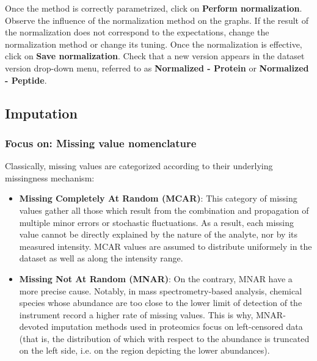 \documentclass[12pt]{article}
\begin{document}
Once the method is correctly parametrized, click on \textbf{Perform normalization}.
Observe the influence of the normalization method on the graphs. %
If the result of the normalization does not correspond to the expectations, change the normalization method or change its tuning.
Once the normalization is effective, click on \textbf{Save normalization}.
Check that a new version appears in the dataset version drop-down menu, referred to as \textbf{Normalized - Protein} or \textbf{Normalized - Peptide}.

\subsection{Imputation}\label{sec:imputation}
\subsubsection{Focus on: Missing value nomenclature}\label{sec:vmnomenclature}
Classically, missing values are categorized according to their underlying missingness mechanism:
\begin{itemize}
	\item \textbf{Missing Completely At Random (MCAR)}: This category of missing values gather
	all those which result from the combination and propagation of multiple minor errors or 
	stochastic fluctuations. As a result, each missing value cannot be directly explained 
	by the nature of the analyte, nor by its measured intensity. MCAR values are assumed to 
	distribute uniformely in the dataset as well as along the intensity range. 
	\item \textbf{Missing Not At Random (MNAR)}: On the contrary, MNAR have a more precise cause.
	Notably, in mass spectrometry-based analysis, chemical species whose abundance are too close 
	to the lower limit of detection of the instrument record a higher rate of missing values. This is why,
MNAR-devoted imputation methods used in proteomics focus on left-censored data (that
is, the distribution of which with respect to the abundance is truncated on the left side,
i.e. on the region depicting the lower abundances).
\end{itemize}
\end{document}
